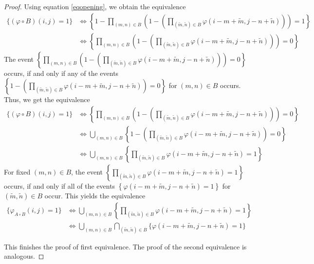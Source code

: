 \documentclass[a4paper,12pt]{article}
\theoremstyle{plain}
\theoremstyle{definition}
\theoremstyle{remark}
\begin{document}
\begin{proof}
	Using equation \eqref{eqopening}, we obtain the equivalence
	\begin{align*}
		\{ (\varphi \circ B)(i, j) = 1 \} &\Leftrightarrow \left\{ 1 - \prod_{(m, n) \in B} \left( 1 - \left( \prod_{(\tilde{m}, \tilde{n}) \in B} \varphi(i - m + \tilde{m}, j - n + \tilde{n}) \right) \right) = 1 \right\} \\
		&\Leftrightarrow \left\{ \prod_{(m, n) \in B} \left( 1 - \left( \prod_{(\tilde{m}, \tilde{n}) \in B} \varphi(i - m + \tilde{m}, j - n + \tilde{n}) \right) \right) = 0 \right\}
	\end{align*}
	The event $\left\{ \prod_{(m, n) \in B} \left( 1 - \left( \prod_{(\tilde{m}, \tilde{n}) \in B} \varphi(i - m + \tilde{m}, j - n + \tilde{n}) \right) \right) = 0 \right\}$ occurs, if and only if any of the events $\left\{ 1 - \left( \prod_{(\tilde{m}, \tilde{n}) \in B} \varphi(i - m + \tilde{m}, j - n + \tilde{n}) \right) = 0 \right\}$ for $(m, n) \in B$ occurs. Thus, we get the equivalence
	\begin{align*}
		\{ (\varphi \circ B)(i, j) = 1 \} &\Leftrightarrow \left\{ \prod_{(m, n) \in B} \left( 1 - \left( \prod_{(\tilde{m}, \tilde{n}) \in B} \varphi(i - m + \tilde{m}, j - n + \tilde{n}) \right) \right) = 0 \right\} \\
		&\Leftrightarrow \bigcup_{(m, n) \in B} \left\{ 1 - \left( \prod_{(\tilde{m}, \tilde{n}) \in B} \varphi(i - m + \tilde{m}, j - n + \tilde{n}) \right) = 0 \right\} \\
		&\Leftrightarrow \bigcup_{(m, n) \in B} \left\{ \prod_{(\tilde{m}, \tilde{n}) \in B} \varphi(i - m + \tilde{m}, j - n + \tilde{n}) = 1 \right\}
	\end{align*}
	For fixed $(m, n) \in B$, the event $\left\{ \prod_{(\tilde{m}, \tilde{n}) \in B} \varphi(i - m + \tilde{m}, j - n + \tilde{n}) = 1 \right\}$ occurs, if and only if all of the events $\left\{ \varphi(i - m + \tilde{m}, j - n + \tilde{n}) = 1 \right\}$ for $(\tilde{m}, \tilde{n}) \in B$ occur. This yields the equivalence
	\begin{align*}
		\{ \varphi_{A \circ B}(i, j) = 1 \} &\Leftrightarrow \bigcup_{(m, n) \in B} \left\{ \prod_{(\tilde{m}, \tilde{n}) \in B} \varphi(i - m + \tilde{m}, j - n + \tilde{n}) = 1 \right\} \\
		&\Leftrightarrow \bigcup_{(m, n) \in B} \bigcap_{(\tilde{m}, \tilde{n}) \in B} \{ \varphi(i - m + \tilde{m}, j - n + \tilde{n}) = 1 \}
	\end{align*}
	
	This finishes the proof of first equivalence. The proof of the second equivalence is analogous.
\end{proof}
\end{document}
